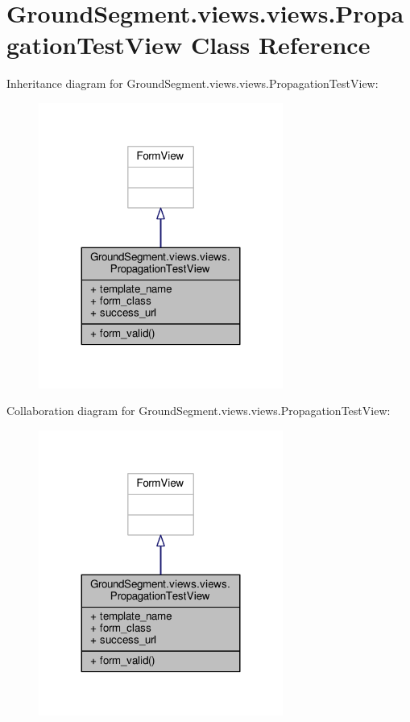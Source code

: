 \hypertarget{class_ground_segment_1_1views_1_1views_1_1_propagation_test_view}{}\section{Ground\+Segment.\+views.\+views.\+Propagation\+Test\+View Class Reference}
\label{class_ground_segment_1_1views_1_1views_1_1_propagation_test_view}


Inheritance diagram for Ground\+Segment.\+views.\+views.\+Propagation\+Test\+View\+:\nopagebreak
\begin{figure}[H]
\begin{center}
\leavevmode
\includegraphics[width=227pt]{class_ground_segment_1_1views_1_1views_1_1_propagation_test_view__inherit__graph}
\end{center}
\end{figure}


Collaboration diagram for Ground\+Segment.\+views.\+views.\+Propagation\+Test\+View\+:\nopagebreak
\begin{figure}[H]
\begin{center}
\leavevmode
\includegraphics[width=227pt]{class_ground_segment_1_1views_1_1views_1_1_propagation_test_view__coll__graph}
\end{center}
\end{figure}
